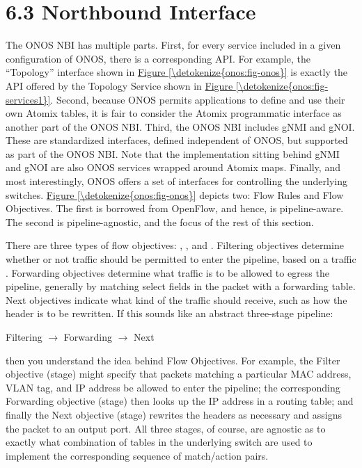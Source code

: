\documentclass[letterpaper,11pt,english]{sphinxmanual}
\begin{document}
\section{6.3 Northbound Interface}
\label{\detokenize{onos:northbound-interface}}
The ONOS NBI has multiple parts. First, for every service included in
a given configuration of ONOS, there is a corresponding API. For
example, the “Topology” interface shown in \hyperref[\detokenize{onos:fig-onos}]{Figure \ref{\detokenize{onos:fig-onos}}} is exactly the API offered by the Topology Service shown
in \hyperref[\detokenize{onos:fig-services1}]{Figure \ref{\detokenize{onos:fig-services1}}}. Second, because ONOS permits
applications to define and use their own Atomix tables, it is fair to
consider the Atomix programmatic interface as another part of the ONOS
NBI. Third, the ONOS NBI includes gNMI and gNOI. These are
standardized interfaces, defined independent of ONOS, but supported as
part of the ONOS NBI. Note that the implementation sitting behind gNMI
and gNOI are also ONOS services wrapped around Atomix maps. Finally,
and most interestingly, ONOS offers a set of interfaces for
controlling the underlying switches. \hyperref[\detokenize{onos:fig-onos}]{Figure \ref{\detokenize{onos:fig-onos}}}
depicts two: Flow Rules and Flow Objectives. The first is borrowed
from OpenFlow, and hence, is pipeline-aware. The second is
pipeline-agnostic, and the focus of the rest of this section.

There are three types of flow objectives: , ,
and . Filtering objectives determine whether or not traffic
should be permitted to enter the pipeline, based on a traffic
. Forwarding objectives determine what traffic is to be
allowed to egress the pipeline, generally by matching select fields in
the packet with a forwarding table. Next objectives indicate what kind
of  the traffic should receive, such as how the header is
to be rewritten. If this sounds like an abstract three-stage pipeline:

\begin{center}Filtering \(\rightarrow\) Forwarding \(\rightarrow\) Next
\end{center}
then you understand the idea behind Flow Objectives. For example, the
Filter objective (stage) might specify that packets matching a
particular MAC address, VLAN tag, and IP address be allowed to enter
the pipeline; the corresponding Forwarding objective (stage) then
looks up the IP address in a routing table; and finally the Next
objective (stage) rewrites the headers as necessary and assigns the
packet to an output port. All three stages, of course, are agnostic as
to exactly what combination of tables in the underlying switch are
used to implement the corresponding sequence of match/action pairs.
\end{document}
